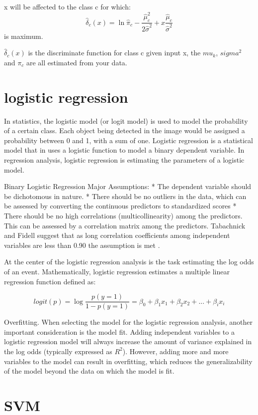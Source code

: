 \documentclass[
]{report}
\begin{document}
x will be affected to the class c for which:
\[\hat\delta_c(x) = \ln \hat\pi_c - \frac{\hat\mu_c^2}{2\hat\sigma^2} + x\frac{\hat\mu_c}{\hat\sigma^2}\] is maximum.

\(\hat\delta_c(x)\) is the discriminate function for class c given input x, the \(mu_k\), \(sigma^2\) and \(\pi_c\) are all estimated from your data.

\hypertarget{logistic-regression}{%
\section{logistic regression}\label{logistic-regression}}

In statistics, the logistic model (or logit model) is used to model the probability of a certain class. Each object being detected in the image would be assigned a probability between 0 and 1, with a sum of one. Logistic regression is a statistical model that in uses a logistic function to model a binary dependent variable. In regression analysis, logistic regression is estimating the parameters of a logistic model.

Binary Logistic Regression Major Assumptions:
* The dependent variable should be dichotomous in nature.
* There should be no outliers in the data, which can be assessed by converting the continuous predictors to standardized scores
* There should be no high correlations (multicollinearity) among the predictors. This can be assessed by a correlation matrix among the predictors. Tabachnick and Fidell suggest that as long correlation coefficients among independent variables are less than 0.90 the assumption is met \citep{log}.

At the center of the logistic regression analysis is the task estimating the log odds of an event. Mathematically, logistic regression estimates a multiple linear regression function defined as:

\[logit(p)= \log \frac{p(y=1)}{1-p(y=1)}= \beta_0 + \beta_1x_1 + \beta_2x_2 + ... + \beta_ix_i\]

Overfitting. When selecting the model for the logistic regression analysis, another important consideration is the model fit. Adding independent variables to a logistic regression model will always increase the amount of variance explained in the log odds (typically expressed as \(R^2\)). However, adding more and more variables to the model can result in overfitting, which reduces the generalizability of the model beyond the data on which the model is fit.

\hypertarget{svm}{%
\section{SVM}\label{svm}}
\end{document}
